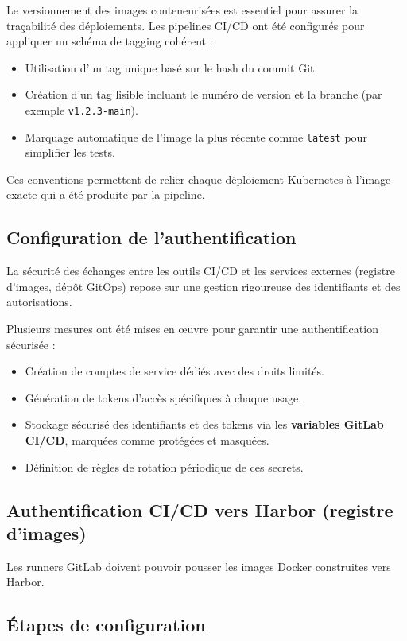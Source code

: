 Le versionnement des images conteneurisées est essentiel pour assurer la traçabilité des déploiements.
Les pipelines CI/CD ont été configurés pour appliquer un schéma de tagging cohérent :
\begin{itemize}
	\item Utilisation d’un tag unique basé sur le hash du commit Git.
	\item Création d’un tag lisible incluant le numéro de version et la branche (par exemple \texttt{v1.2.3-main}).
	\item Marquage automatique de l’image la plus récente comme \texttt{latest} pour simplifier les tests.
\end{itemize}

Ces conventions permettent de relier chaque déploiement Kubernetes à l’image exacte qui a été produite par la pipeline.

\subsection{Configuration de l’authentification}

La sécurité des échanges entre les outils CI/CD et les services externes (registre d’images, dépôt GitOps) repose sur une gestion rigoureuse des identifiants et des autorisations.

Plusieurs mesures ont été mises en œuvre pour garantir une authentification sécurisée :
\begin{itemize}
	\item Création de comptes de service dédiés avec des droits limités.
	\item Génération de tokens d’accès spécifiques à chaque usage.
	\item Stockage sécurisé des identifiants et des tokens via les \textbf{variables GitLab CI/CD}, marquées comme protégées et masquées.
	\item Définition de règles de rotation périodique de ces secrets.
\end{itemize}

\subsection{Authentification CI/CD vers Harbor (registre d’images)}

Les runners GitLab doivent pouvoir pousser les images Docker construites vers Harbor.

\subsection{Étapes de configuration}

